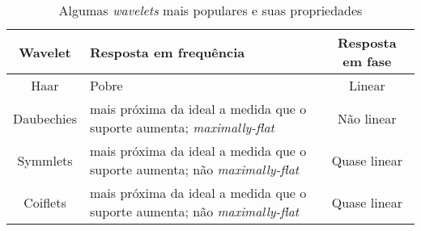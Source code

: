 \begin{table}[h]
	\centering
	\begin{tabular}{|c|p{75mm}|c|}
			\hline 
			\textbf{Wavelet} & \textbf{Resposta em frequência} & \textbf{Resposta em fase} \\ 
			\hline 
			Haar & Pobre &  Linear \\ 
			\hline 
			Daubechies & mais próxima da ideal a medida que o \newline  suporte aumenta; \textit{maximally-flat}  &  Não linear \\ 
			\hline 
			Symmlets & mais próxima da ideal a medida que o \newline  suporte aumenta; não \textit{maximally-flat}  & Quase linear \\ 
			\hline 
			Coiflets & mais próxima da ideal a medida que o \newline  suporte aumenta; não \textit{maximally-flat}  & Quase linear \\ 
			\hline 
	\end{tabular} 
	\caption{Algumas \textit{wavelets} mais populares e suas propriedades}
	\label{tab:waveletsProperties}
\end{table}
